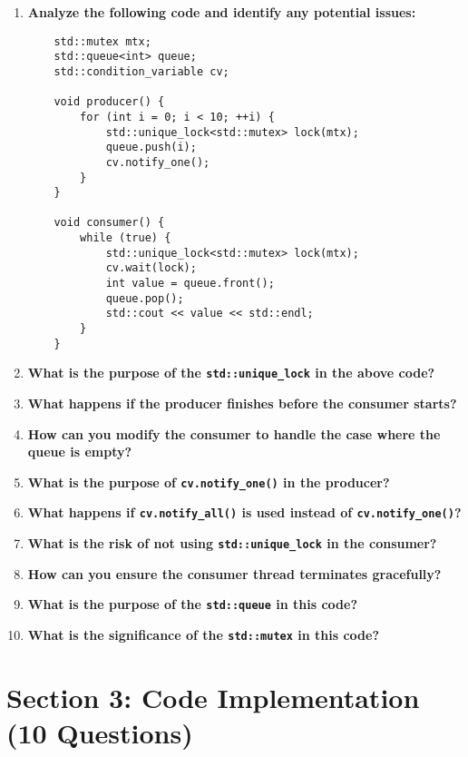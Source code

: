 \documentclass[12pt]{article}
\begin{document}
\begin{enumerate}
    \item \textbf{Analyze the following code and identify any potential issues:}
    \begin{verbatim}
    std::mutex mtx;
    std::queue<int> queue;
    std::condition_variable cv;

    void producer() {
        for (int i = 0; i < 10; ++i) {
            std::unique_lock<std::mutex> lock(mtx);
            queue.push(i);
            cv.notify_one();
        }
    }

    void consumer() {
        while (true) {
            std::unique_lock<std::mutex> lock(mtx);
            cv.wait(lock);
            int value = queue.front();
            queue.pop();
            std::cout << value << std::endl;
        }
    }
    \end{verbatim}

    \item \textbf{What is the purpose of the \texttt{std::unique\_lock} in the above code?}

    \item \textbf{What happens if the producer finishes before the consumer starts?}

    \item \textbf{How can you modify the consumer to handle the case where the queue is empty?}

    \item \textbf{What is the purpose of \texttt{cv.notify\_one()} in the producer?}

    \item \textbf{What happens if \texttt{cv.notify\_all()} is used instead of \texttt{cv.notify\_one()}?}

    \item \textbf{What is the risk of not using \texttt{std::unique\_lock} in the consumer?}

    \item \textbf{How can you ensure the consumer thread terminates gracefully?}

    \item \textbf{What is the purpose of the \texttt{std::queue} in this code?}

    \item \textbf{What is the significance of the \texttt{std::mutex} in this code?}
\end{enumerate}

\section*{Section 3: Code Implementation (10 Questions)}
\end{document}
